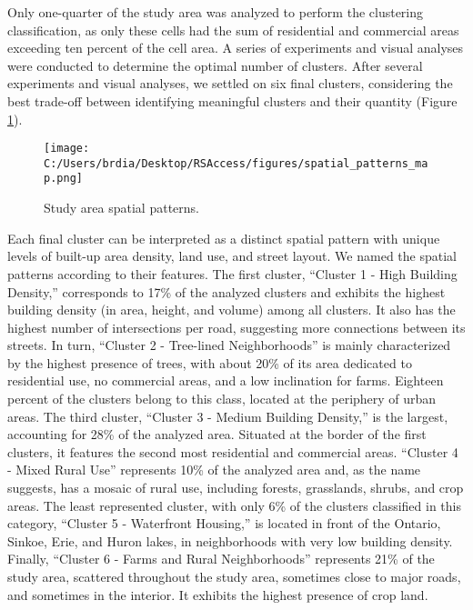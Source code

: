 \documentclass[conference,final,]{IEEEtran}
\begin{document}
Only one-quarter of the study area was analyzed to perform the
clustering classification, as only these cells had the sum of
residential and commercial areas exceeding ten percent of the cell area.
A series of experiments and visual analyses were conducted to determine
the optimal number of clusters. After several experiments and visual
analyses, we settled on six final clusters, considering the best
trade-off between identifying meaningful clusters and their quantity
(Figure \ref{fig:clusters_map}).

\begin{figure}[!bt]
\centering
\texttt{[image: C:/Users/brdia/Desktop/RSAccess/figures/spatial\_patterns\_map.png]}
\caption{Study area spatial patterns.}
\label{fig:clusters_map}
\end{figure}

Each final cluster can be interpreted as a distinct spatial pattern with
unique levels of built-up area density, land use, and street layout. We
named the spatial patterns according to their features. The first
cluster, ``Cluster 1 - High Building Density,'' corresponds to 17\% of
the analyzed clusters and exhibits the highest building density (in
area, height, and volume) among all clusters. It also has the highest
number of intersections per road, suggesting more connections between
its streets. In turn, ``Cluster 2 - Tree-lined Neighborhoods'' is mainly
characterized by the highest presence of trees, with about 20\% of its
area dedicated to residential use, no commercial areas, and a low
inclination for farms. Eighteen percent of the clusters belong to this
class, located at the periphery of urban areas. The third cluster,
``Cluster 3 - Medium Building Density,'' is the largest, accounting for
28\% of the analyzed area. Situated at the border of the first clusters,
it features the second most residential and commercial areas. ``Cluster
4 - Mixed Rural Use'' represents 10\% of the analyzed area and, as the
name suggests, has a mosaic of rural use, including forests, grasslands,
shrubs, and crop areas. The least represented cluster, with only 6\% of
the clusters classified in this category, ``Cluster 5 - Waterfront
Housing,'' is located in front of the Ontario, Sinkoe, Erie, and Huron
lakes, in neighborhoods with very low building density. Finally,
``Cluster 6 - Farms and Rural Neighborhoods'' represents 21\% of the
study area, scattered throughout the study area, sometimes close to
major roads, and sometimes in the interior. It exhibits the highest
presence of crop land.
\end{document}
